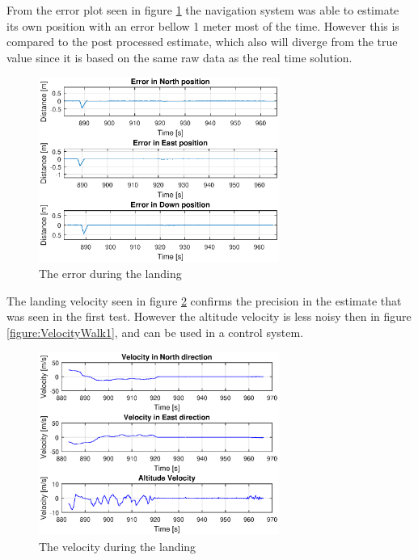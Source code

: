 From the error plot seen in figure \ref{figure:landingErrorNorthEastDownFlight} the navigation system was able to estimate its own position with an error bellow 1 meter most of the time. However this is compared to the post processed estimate, which also will diverge from the true value since it is based on the same raw data as the real time solution.

\begin{figure}[H]
	\centering
		\includegraphics[width=0.7\textwidth]{figs/plots/landingErrorNorthEastDownFlight.eps}
		\caption{The error during the landing}
		\label{figure:landingErrorNorthEastDownFlight}
\end{figure}
The landing velocity seen in figure \ref{figure:landingVelocity} confirms the precision in the estimate that was seen in the first test. However the altitude velocity is less noisy then in figure \ref{figure:VelocityWalk1}, and can be used in a control system.
\begin{figure}[H]
	\centering
		\includegraphics[width=0.7\textwidth]{figs/plots/landingVelocity.eps}
		\caption{The velocity during the landing}
		\label{figure:landingVelocity}
\end{figure}
\cleardoublepage